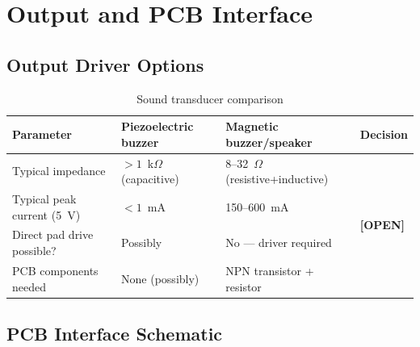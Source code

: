 \documentclass[11pt,a4paper]{article}
\newcommand{\openitem}{\textcolor{open}{\textbf{[OPEN]}}}
\begin{document}
\section{Output and PCB Interface}

\subsection{Output Driver Options}

\begin{table}[H]
  \centering
  \caption{Sound transducer comparison}
  \begin{tabular}{p{3.5cm}p{3.5cm}p{3.5cm}p{2.5cm}}
    \toprule
    \textbf{Parameter} & \textbf{Piezoelectric buzzer} &
    \textbf{Magnetic buzzer/speaker} & \textbf{Decision} \\
    \midrule
    Typical impedance & $>1$~k$\Omega$ (capacitive) & 8--32~$\Omega$ (resistive+inductive) &
    \multirow{4}{*}{\openitem} \\
    Typical peak current (5~V) & $<1$~mA & 150--600~mA & \\
    Direct pad drive possible? & Possibly & No --- driver required & \\
    PCB components needed & None (possibly) & NPN transistor + resistor & \\
    \bottomrule
  \end{tabular}
\end{table}

\subsection{PCB Interface Schematic}
\end{document}
